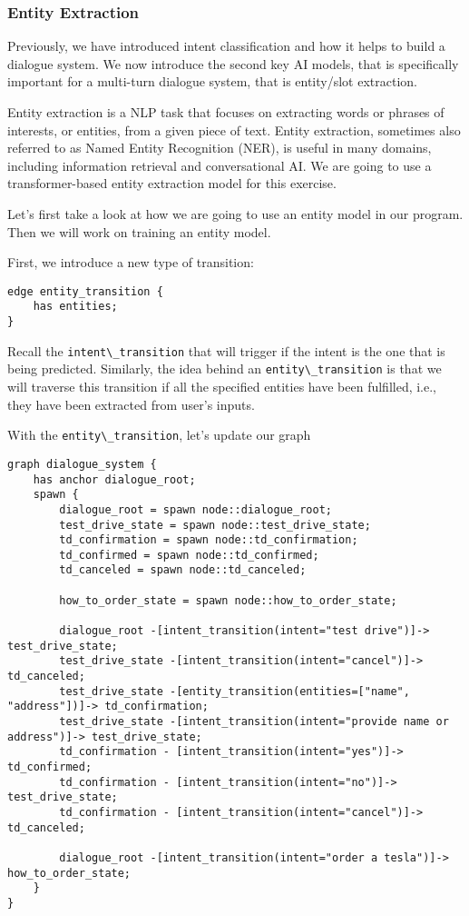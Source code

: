 \hypertarget{entity-extraction}{%
\subsubsection{Entity Extraction}\label{entity-extraction}}

Previously, we have introduced intent classification and how it helps to
build a dialogue system. We now introduce the second key AI models, that
is specifically important for a multi-turn dialogue system, that is
entity/slot extraction.

Entity extraction is a NLP task that focuses on extracting words or
phrases of interests, or entities, from a given piece of text. Entity
extraction, sometimes also referred to as Named Entity Recognition
(NER), is useful in many domains, including information retrieval and
conversational AI. We are going to use a transformer-based entity
extraction model for this exercise.

Let's first take a look at how we are going to use an entity model in
our program. Then we will work on training an entity model.

First, we introduce a new type of transition:

\begin{lstlisting}
edge entity_transition {
    has entities;
}
\end{lstlisting}

Recall the \passthrough{\lstinline!intent\_transition!} that will
trigger if the intent is the one that is being predicted. Similarly, the
idea behind an \passthrough{\lstinline!entity\_transition!} is that we
will traverse this transition if all the specified entities have been
fulfilled, i.e., they have been extracted from user's inputs.

With the \passthrough{\lstinline!entity\_transition!}, let's update our
graph

\begin{lstlisting}
graph dialogue_system {
    has anchor dialogue_root;
    spawn {
        dialogue_root = spawn node::dialogue_root;
        test_drive_state = spawn node::test_drive_state;
        td_confirmation = spawn node::td_confirmation;
        td_confirmed = spawn node::td_confirmed;
        td_canceled = spawn node::td_canceled;

        how_to_order_state = spawn node::how_to_order_state;

        dialogue_root -[intent_transition(intent="test drive")]-> test_drive_state;
        test_drive_state -[intent_transition(intent="cancel")]-> td_canceled;
        test_drive_state -[entity_transition(entities=["name", "address"])]-> td_confirmation;
        test_drive_state -[intent_transition(intent="provide name or address")]-> test_drive_state;
        td_confirmation - [intent_transition(intent="yes")]-> td_confirmed;
        td_confirmation - [intent_transition(intent="no")]-> test_drive_state;
        td_confirmation - [intent_transition(intent="cancel")]-> td_canceled;

        dialogue_root -[intent_transition(intent="order a tesla")]-> how_to_order_state;
    }
}
\end{lstlisting}


